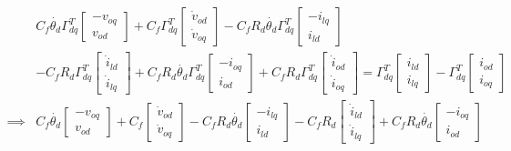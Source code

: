 \begin{align*}
	&C_f\dot{\theta_d}\Gamma_{dq}^T\begin{bmatrix}
		-v_{oq}\\v_{od}
	\end{bmatrix}+C_f\Gamma_{dq}^T\begin{bmatrix}
		\dot{v}_{od}\\ \dot{v}_{oq}
	\end{bmatrix}-C_fR_d\dot{\theta_d}\Gamma_{dq}^T\begin{bmatrix}
		-i_{lq}\\i_{ld}
	\end{bmatrix}\\
	&-C_fR_d\Gamma_{dq}^T\begin{bmatrix}
		\dot{i}_{ld}\\ \dot{i}_{lq}
	\end{bmatrix} + C_fR_d \dot{\theta_d}\Gamma_{dq}^T\begin{bmatrix}
		-i_{oq}\\i_{od}
	\end{bmatrix}+C_fR_d\Gamma_{dq}^T\begin{bmatrix}
		\dot{i}_{od}\\ \dot{i}_{oq}
	\end{bmatrix} = \Gamma_{dq}^T\begin{bmatrix}
		i_{ld}\\i_{lq}
	\end{bmatrix}-\Gamma_{dq}^T\begin{bmatrix}
		i_{od}\\i_{oq}
	\end{bmatrix}\\
	\implies & C_f\dot{\theta_d}\begin{bmatrix}
	-v_{oq}\\v_{od}
	\end{bmatrix}+C_f\begin{bmatrix}
	\dot{v}_{od}\\ \dot{v}_{oq}
	\end{bmatrix}-C_fR_d\dot{\theta_d}\begin{bmatrix}
	-i_{lq}\\i_{ld}
	\end{bmatrix}-C_fR_d\begin{bmatrix}
	\dot{i}_{ld}\\ \dot{i}_{lq}
	\end{bmatrix} + C_fR_d \dot{\theta_d}\begin{bmatrix}
	-i_{oq}\\i_{od}

\end{bmatrix}
\end{align*}
